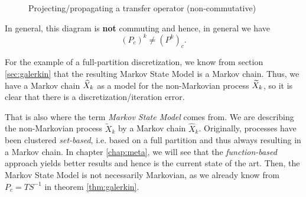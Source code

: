 \begin{figure}[!ht]
	\centering
\caption{Projecting/propagating a transfer operator (non-commutative)}
\label{fig:diagram_transfer}
\end{figure}
In general, this diagram is \textbf{not} commuting and hence, in general we have
\begin{equation*}
(P_c)^k \neq (P^k)_c.
\end{equation*}

For the example of a full-partition discretization, we know from section \ref{sec:galerkin} that the resulting Markov State Model is a Markov chain. Thus, we have a Markov chain $\widehat{X}_k$ as a model for the non-Markovian process $\widetilde{X}_k$, so it is clear that there is a discretization/iteration error.

That is also where the term \textit{Markov State Model} comes from. We are describing the non-Markovian process $\widetilde{X}_k$ by a Markov chain $\widehat{X}_k$.
Originally, processes have been clustered \textit{set-based}, i.e. based on a full partition and thus always resulting in a Markov chain. In chapter \ref{chap:meta}, we will see that the \textit{function-based} approach yields better results and hence is the current state of the art. Then, the Markov State Model is not necessarily Markovian, as we already know from $P_c = TS^{-1}$ in theorem \ref{thm:galerkin}.


